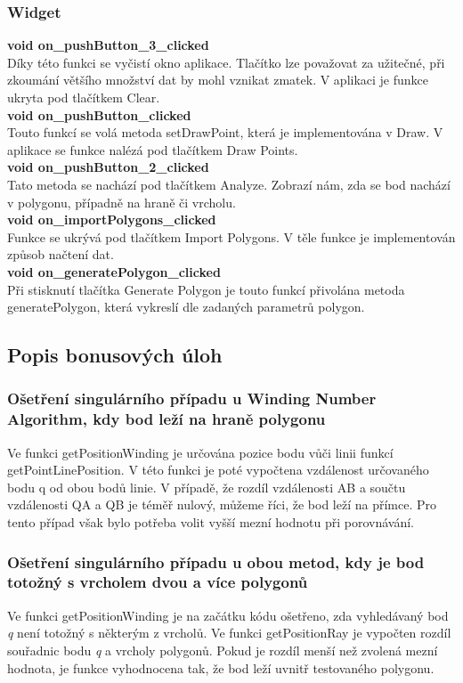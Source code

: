 \documentclass[a4paper, 12pt]{article}
\begin{document}
\subsubsection{Widget}
\textbf{void on\_pushButton\_3\_clicked}\\
Díky této funkci se vyčistí okno aplikace. Tlačítko lze považovat za užitečné, při zkoumání většího množství dat by mohl vznikat zmatek. V aplikaci je funkce ukryta pod tlačítkem Clear.\\

\textbf{void on\_pushButton\_clicked}\\
Touto funkcí se volá metoda setDrawPoint, která je implementována v Draw. V aplikace se funkce nalézá pod tlačítkem Draw Points. \\

\textbf{void on\_pushButton\_2\_clicked}\\
Tato metoda se nachází pod tlačítkem Analyze. Zobrazí nám, zda se bod nachází v polygonu, případně na hraně či vrcholu.\\

\textbf{void on\_importPolygons\_clicked}\\
Funkce se ukrývá pod tlačítkem Import Polygons. V těle funkce je implementován způsob načtení dat.\\

\textbf{void on\_generatePolygon\_clicked}\\
Při stisknutí tlačítka Generate Polygon je touto funkcí přivolána metoda generatePolygon, která vykreslí dle zadaných parametrů polygon.



\subsection{Popis bonusových úloh}
\subsubsection{Ošetření singulárního případu u Winding Number Algorithm, kdy bod leží na hraně polygonu}
Ve funkci getPositionWinding je určována pozice bodu vůči linii funkcí getPointLinePosition. V této funkci je poté vypočtena vzdálenost určovaného bodu q od obou bodů linie. V případě, že rozdíl vzdálenosti AB a součtu vzdálenosti QA a QB je téměř nulový, můžeme říci, že bod leží na přímce. Pro tento případ však bylo potřeba volit vyšší mezní hodnotu při porovnávání. 

\subsubsection{Ošetření singulárního případu u obou metod, kdy je bod totožný s vrcholem dvou a více polygonů}
Ve funkci getPositionWinding je na začátku kódu ošetřeno, zda vyhledávaný bod \textit{q} není totožný s některým z vrcholů. Ve funkci getPositionRay je vypočten rozdíl souřadnic bodu \textit{q} a vrcholy polygonů. Pokud je rozdíl menší než zvolená mezní hodnota, je funkce vyhodnocena tak, že bod leží uvnitř testovaného polygonu.
\end{document}
